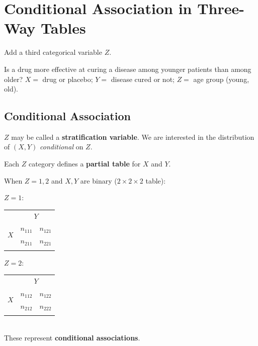 \documentclass[11pt]{elegantbook}
\begin{document}
\section{Conditional Association in Three-Way Tables}
Add a third categorical variable $Z$.
\begin{example}
    Is a drug more effective at curing a disease among younger patients than among older?
    $X=$ drug or placebo; $Y=$ disease cured or not; $Z=$ age group (young, old).
\end{example}
\subsection{Conditional Association}
$Z$ may be called a \textbf{stratification variable}. We are interested in the distribution of $(X, Y)$ \textit{conditional} on $Z$.

\begin{definition}
    Each $Z$ category defines a \textbf{partial table} for $X$ and $Y$.
\end{definition}
\begin{example}
    When $Z = 1, 2$ and $X , Y$ are binary ($2\times 2 \times 2$ table):
    \begin{table}[htbp]
        \centering
        $Z=1:$
        \begin{tabular}{rllll}
            \multicolumn{1}{c}{}                    & \multicolumn{4}{c}{$Y$}                                 \\ \cline{2-5} 
            \multicolumn{1}{r|}{\multirow{2}{*}{$X$}} & \multicolumn{2}{l|}{$n_{111}$} & \multicolumn{2}{l|}{$n_{121}$} \\ \cline{2-5} 
            \multicolumn{1}{r|}{}                   & \multicolumn{2}{l|}{$n_{211}$} & \multicolumn{2}{l|}{$n_{221}$} \\ \cline{2-5}
            \multicolumn{1}{l}{}                    &             &             &             &
        \end{tabular}\quad\quad
        $Z=2:$
        \begin{tabular}{rllll}
            \multicolumn{1}{c}{}                    & \multicolumn{4}{c}{$Y$}                                 \\ \cline{2-5} 
            \multicolumn{1}{r|}{\multirow{2}{*}{$X$}} & \multicolumn{2}{l|}{$n_{112}$} & \multicolumn{2}{l|}{$n_{122}$} \\ \cline{2-5} 
            \multicolumn{1}{r|}{}                   & \multicolumn{2}{l|}{$n_{212}$} & \multicolumn{2}{l|}{$n_{222}$} \\ \cline{2-5}
            \multicolumn{1}{l}{}                    &             &             &             &
        \end{tabular}\\
        These represent \textbf{conditional associations}.
    \end{table}\\
\end{example}
\end{document}

